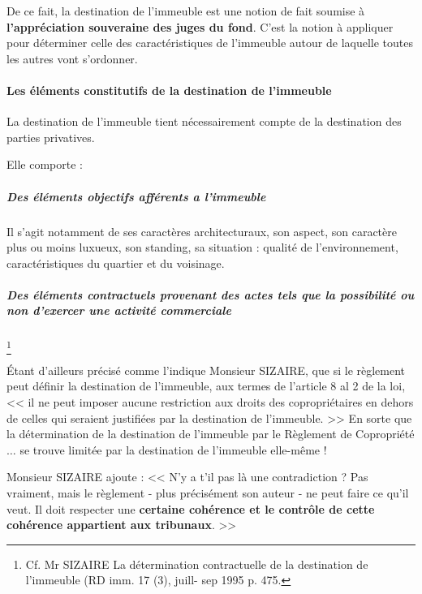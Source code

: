 				De ce fait, la destination de l'immeuble est une notion de fait soumise à \textbf{l'appréciation souveraine des juges du fond}. C'est la notion à appliquer pour déterminer celle des caractéristiques de l'immeuble autour de laquelle toutes les autres vont s'ordonner.
			
			\paragraph{Les éléments constitutifs de la destination de l’immeuble}
			
			La destination de l'immeuble tient nécessairement compte de la destination des parties privatives.
			
			Elle comporte :
	
			\subparagraph{Des éléments objectifs afférents a l'immeuble}
			
				Il s’agit notamment de ses caractères architecturaux, son aspect, son caractère plus ou moins luxueux, son standing, sa situation : qualité de l'environnement, caractéristiques du quartier et du voisinage.
			
			\subparagraph{Des éléments contractuels provenant des actes tels que la possibilité ou non d'exercer une activité commerciale}\footnote{Cf. Mr SIZAIRE La détermination contractuelle de la destination de l'immeuble (RD imm. 17 (3), juill- sep 1995 p. 475. }
			
				Étant d'ailleurs précisé comme l'indique Monsieur SIZAIRE, que si le règlement peut définir la destination de l'immeuble, aux termes de l'article 8 al 2 de la loi, << il ne peut imposer aucune restriction aux droits des copropriétaires en dehors de celles qui seraient justifiées par la destination de l'immeuble. >> En sorte que la détermination de la destination de l'immeuble par le Règlement de Copropriété $\dots$ se trouve limitée par la destination de l'immeuble elle-même !
				
				Monsieur SIZAIRE ajoute : << N'y a t’il pas là une contradiction ? Pas vraiment, mais le règlement - plus précisément son auteur - ne peut faire ce qu'il veut. Il doit respecter une \textbf{certaine cohérence et le contrôle de cette cohérence appartient aux tribunaux}. >>
				
